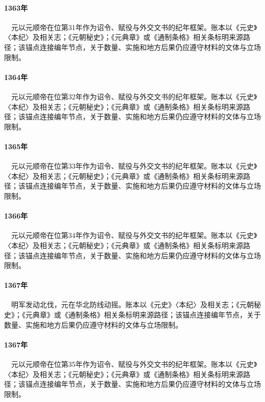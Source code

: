 \paragraph{1363年}　元以元顺帝在位第31年作为诏令、赋役与外交文书的纪年框架。账本以《元史》〈本纪〉及相关志；《元朝秘史》；《元典章》或《通制条格》相关条标明来源路径；该锚点连接编年节点，关于数量、实施和地方后果仍应遵守材料的文体与立场限制。

\paragraph{1364年}　元以元顺帝在位第32年作为诏令、赋役与外交文书的纪年框架。账本以《元史》〈本纪〉及相关志；《元朝秘史》；《元典章》或《通制条格》相关条标明来源路径；该锚点连接编年节点，关于数量、实施和地方后果仍应遵守材料的文体与立场限制。

\paragraph{1365年}　元以元顺帝在位第33年作为诏令、赋役与外交文书的纪年框架。账本以《元史》〈本纪〉及相关志；《元朝秘史》；《元典章》或《通制条格》相关条标明来源路径；该锚点连接编年节点，关于数量、实施和地方后果仍应遵守材料的文体与立场限制。

\paragraph{1366年}　元以元顺帝在位第34年作为诏令、赋役与外交文书的纪年框架。账本以《元史》〈本纪〉及相关志；《元朝秘史》；《元典章》或《通制条格》相关条标明来源路径；该锚点连接编年节点，关于数量、实施和地方后果仍应遵守材料的文体与立场限制。

\paragraph{1367年}　明军发动北伐，元在华北防线动摇。账本以《元史》〈本纪〉及相关志；《元朝秘史》；《元典章》或《通制条格》相关条标明来源路径；该锚点连接编年节点，关于数量、实施和地方后果仍应遵守材料的文体与立场限制。

\paragraph{1367年}　元以元顺帝在位第35年作为诏令、赋役与外交文书的纪年框架。账本以《元史》〈本纪〉及相关志；《元朝秘史》；《元典章》或《通制条格》相关条标明来源路径；该锚点连接编年节点，关于数量、实施和地方后果仍应遵守材料的文体与立场限制。

